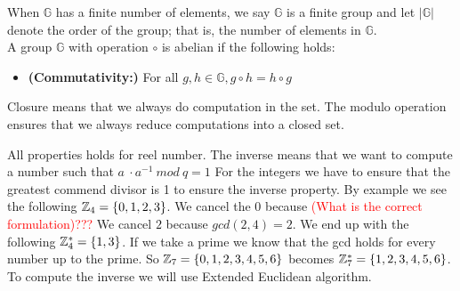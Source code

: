 \begin{defi}
\begin{itemize}
\end{itemize}
When \begin{math}\mathbb{G}\end{math} has a finite number of elements, we say \begin{math}\mathbb{G}\end{math} is a finite group and let
\begin{math}| \mathbb{G}|\end{math} denote the order of the group; that is, the number of elements in \begin{math}\mathbb{G}\end{math}. \\
A group \begin{math}\mathbb{G}\end{math} with operation \begin{math}\circ\end{math} is abelian if the following holds:
\begin{itemize}
\item \textnormal{\textbf{(Commutativity:)}} For all \begin{math}g, h \in \mathbb{G}, g \circ h = h \circ g \end{math}
\end{itemize}
\end{defi}

 Closure means that we always do computation in the set. The modulo operation ensures that we always reduce computations into a closed set.

 All properties holds for reel number. The inverse means that we want to compute a number such that \begin{math}a\ \cdot a^{-1} \ mod \ q = 1 \end{math}  For the integers we have to ensure that the greatest commend divisor is 1 to ensure the inverse property. By example we see the following \begin{math} \mathbb{Z}_4 = \{0,1,2,3\}\end{math}. We cancel the \begin{math}0\end{math} because \textcolor{red}{(What is the correct formulation)???} We cancel \begin{math}2\end{math} because \begin{math}gcd(2,4)=2\end{math}. We end up with the following \begin{math} \mathbb{Z}_4^* = \{1,3\}\end{math}. If we take a prime we know that the gcd holds for every number up to the prime. So  \begin{math} \mathbb{Z}_7 = \{0,1,2,3,4,5,6\}\end{math} becomes \begin{math} \mathbb{Z}_7^* = \{1,2,3,4,5,6\}\end{math}. To compute the inverse we will use Extended Euclidean algorithm.


